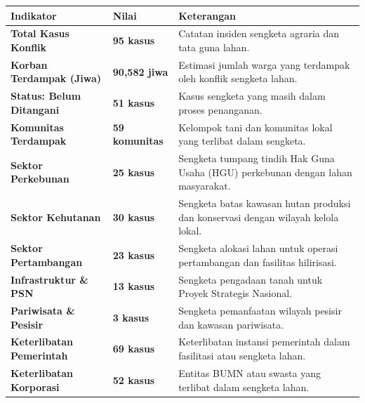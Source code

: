 \documentclass[
]{article}
\newcounter{none} %
\begin{document}
{\def\LTcaptype{none} %
\begin{longtable}[]{@{}
  >{\raggedright\arraybackslash}p{}
  >{\raggedright\arraybackslash}p{}
  >{\raggedright\arraybackslash}p{}@{}}
\toprule\noalign{}
\begin{minipage}[b]{\linewidth}\raggedright
Indikator
\end{minipage} & \begin{minipage}[b]{\linewidth}\raggedright
Nilai
\end{minipage} & \begin{minipage}[b]{\linewidth}\raggedright
Keterangan
\end{minipage} \\
\midrule\noalign{}
\endhead
\bottomrule\noalign{}
\endlastfoot
\textbf{Total Kasus Konflik} & \textbf{95 kasus} & Catatan insiden
sengketa agraria dan tata guna lahan. \\
\textbf{Korban Terdampak (Jiwa)} & \textbf{90,582 jiwa} & Estimasi
jumlah warga yang terdampak oleh konflik sengketa lahan. \\
\textbf{Status: Belum Ditangani} & \textbf{51 kasus} & Kasus sengketa
yang masih dalam proses penanganan. \\
\textbf{Komunitas Terdampak} & \textbf{59 komunitas} & Kelompok tani dan
komunitas lokal yang terlibat dalam sengketa. \\
\textbf{Sektor Perkebunan} & \textbf{25 kasus} & Sengketa tumpang tindih
Hak Guna Usaha (HGU) perkebunan dengan lahan masyarakat. \\
\textbf{Sektor Kehutanan} & \textbf{30 kasus} & Sengketa batas kawasan
hutan produksi dan konservasi dengan wilayah kelola lokal. \\
\textbf{Sektor Pertambangan} & \textbf{23 kasus} & Sengketa alokasi
lahan untuk operasi pertambangan dan fasilitas hilirisasi. \\
\textbf{Infrastruktur \& PSN} & \textbf{13 kasus} & Sengketa pengadaan
tanah untuk Proyek Strategis Nasional. \\
\textbf{Pariwisata \& Pesisir} & \textbf{3 kasus} & Sengketa pemanfaatan
wilayah pesisir dan kawasan pariwisata. \\
\textbf{Keterlibatan Pemerintah} & \textbf{69 kasus} & Keterlibatan
instansi pemerintah dalam fasilitasi atau sengketa lahan. \\
\textbf{Keterlibatan Korporasi} & \textbf{52 kasus} & Entitas BUMN atau
swasta yang terlibat dalam sengketa lahan. \\
\end{longtable}
}
\end{document}
